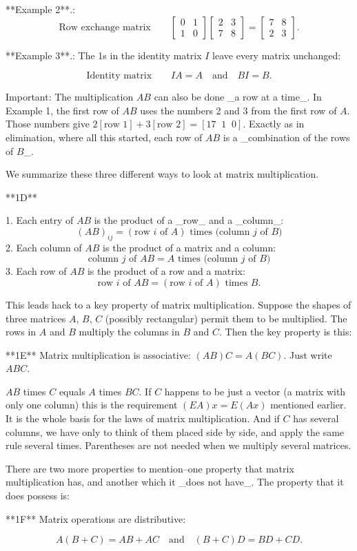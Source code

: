 

**Example 2**.: \[\mbox{Row exchange matrix}\qquad\begin{bmatrix}0&1\\ 1&0\end{bmatrix}\begin{bmatrix}2&3\\ 7&8\end{bmatrix}=\begin{bmatrix}7&8\\ 2&3\end{bmatrix}.\]

**Example 3**.: The 1s in the identity matrix \(I\) leave every matrix unchanged:

\[\mbox{Identity matrix}\qquad IA=A\quad\mbox{and}\quad BI=B.\]

Important: The multiplication \(AB\) can also be done _a row at a time_. In Example 1, the first row of \(AB\) uses the numbers 2 and 3 from the first row of \(A\). Those numbers give \(2[\mbox{row }1]+3[\mbox{row }2]=[17\;\;1\;\;0]\). Exactly as in elimination, where all this started, each row of \(AB\) is a _combination of the rows of \(B\)_.

We summarize these three different ways to look at matrix multiplication.

**1D**

1. Each entry of \(AB\) is the product of a _row_ and a _column_: \[(AB)_{ij}=(\mbox{row }i\mbox{ of }A)\mbox{ times (column }j\mbox{ of }B)\]
2. Each column of \(AB\) is the product of a matrix and a column: \[\mbox{column }j\mbox{ of }AB=A\mbox{ times (column }j\mbox{ of }B)\]
3. Each row of \(AB\) is the product of a row and a matrix: \[\mbox{row }i\mbox{ of }AB=(\mbox{row }i\mbox{ of }A)\mbox{ times }B.\]

This leads hack to a key property of matrix multiplication. Suppose the shapes of three matrices \(A\), \(B\), \(C\) (possibly rectangular) permit them to be multiplied. The rows in \(A\) and \(B\) multiply the columns in \(B\) and \(C\). Then the key property is this:

**1E** Matrix multiplication is associative: \((AB)C=A(BC)\). Just write \(ABC\).

\(AB\) times \(C\) equals \(A\) times \(BC\). If \(C\) happens to be just a vector (a matrix with only one column) this is the requirement \((EA)x=E(Ax)\) mentioned earlier. It is the whole basis for the laws of matrix multiplication. And if \(C\) has several columns, we have only to think of them placed side by side, and apply the same rule several times. Parentheses are not needed when we multiply several matrices.

There are two more properties to mention--one property that matrix multiplication has, and another which it _does not have_. The property that it does possess is:

**1F** Matrix operations are distributive:

\[A(B+C)=AB+AC\quad\mbox{and}\quad(B+C)D=BD+CD.\]